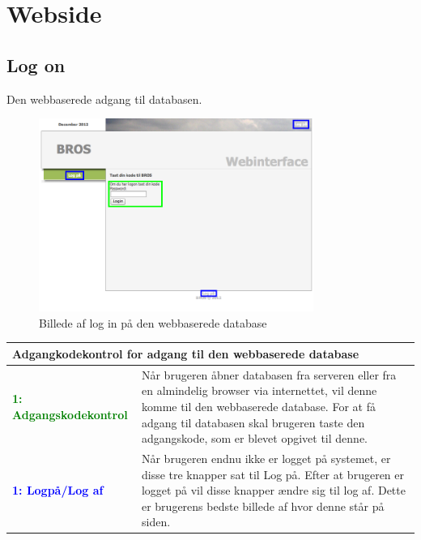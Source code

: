 \section*{Webside}
\subsection*{Log on}
Den webbaserede adgang til databasen.
\begin{figure}[H]
	\centering
	\includegraphics[width=0.8\textwidth]{billeder/database/web_forside}
	\caption{Billede af log in på den webbaserede database}
	\label{fig:web_pass}
\end{figure}

\begin{table}[H]
\begin{tabular}{l p{12.5cm}}
\multicolumn{2}{l}{Adgangkodekontrol for adgang til den webbaserede database } \\
\hline
\textcolor{green}{\textbf{1: Adgangskodekontrol}}
&Når brugeren åbner databasen fra serveren eller fra en almindelig browser via internettet, vil denne komme til den webbaserede database. For at få adgang til databasen skal brugeren taste den adgangskode, som er blevet opgivet til denne.\\
\textcolor{blue}{\textbf{1: Logpå/Log af}}
&Når brugeren endnu ikke er logget på systemet, er disse tre knapper sat til Log på. Efter at brugeren er logget på vil disse knapper ændre sig til log af. Dette er brugerens bedste billede af hvor denne står på siden.
\end{tabular}
\end{table}

